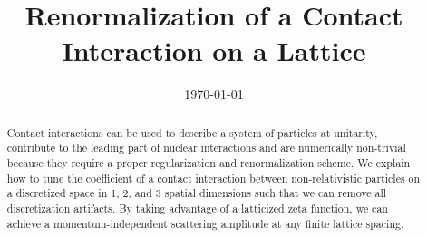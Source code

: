 \documentclass[aps,superscriptaddress,tightenlines,nofootinbib,floatfix,longbibliography,notitlepage,10pt,pra]{revtex4-1}
\begin{document}
\title{Renormalization of a Contact Interaction on a Lattice}


\date{\today}

\begin{abstract}
Contact interactions can be used to describe a system of particles at unitarity, contribute to the leading part of nuclear interactions and are numerically non-trivial because they require a proper regularization and renormalization scheme.
We explain how to tune the coefficient of a contact interaction between non-relativistic particles on a discretized space in 1, 2, and 3 spatial dimensions such that we can remove all discretization artifacts.
By taking advantage of a latticized \Luscher zeta function, we can achieve a momentum-independent scattering amplitude at any finite lattice spacing.
\end{abstract}

\maketitle





   



\appendix
   
  






\end{document}
